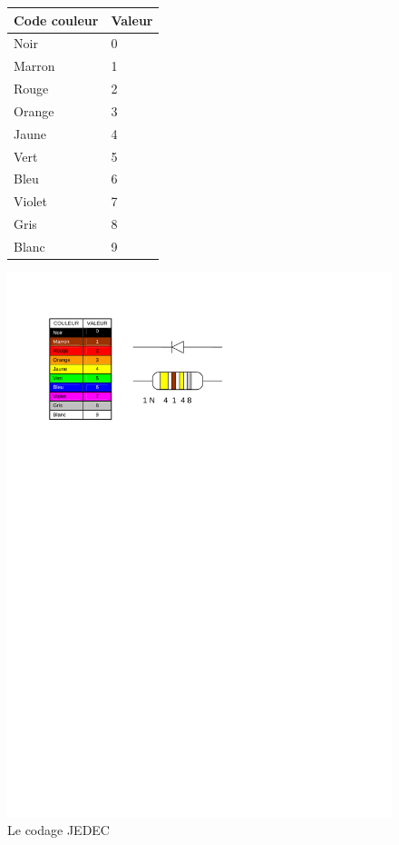 \documentclass[a4paper]{article}
\begin{document}
\begin{figure}[H]
\begin{minipage}[c]{.45\linewidth}
	\flushright
		\begin{tabular}{|l|l|}\hline
			Code couleur & Valeur\\\hline\hline
			\cellcolor{black}\color{white}Noir & 0\\\hline
			\cellcolor{marron}\color{white}Marron & 1\\\hline
			\cellcolor{red}Rouge & 2\\\hline
			\cellcolor{orange}Orange & 3\\\hline
			\cellcolor{yellow}Jaune & 4\\\hline
			\cellcolor{green}Vert & 5\\\hline
			\cellcolor{blue}\color{white}Bleu & 6\\\hline
			\cellcolor{purple}Violet & 7\\\hline
			\cellcolor{gray}Gris & 8\\\hline
			\cellcolor{white}Blanc & 9\\\hline
		\end{tabular}
	\end{minipage} \hfill
	\begin{minipage}[c]{.45\linewidth}
		\flushleft
		\includegraphics[scale=1.00]{Images/Code_JEDEC_diodes}
	\end{minipage}	
	\caption{Le codage JEDEC
		\label{Code_JEDEC_diodes}}
\end{figure}
\end{document}
